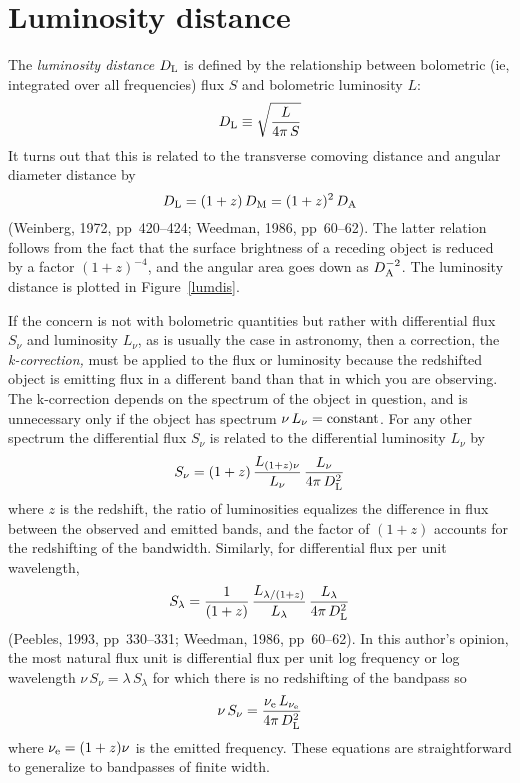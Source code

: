 \section{Luminosity distance}

The {\em luminosity distance\/} $D_{\rm L}$ is defined by the
relationship between bolometric (ie, integrated over all frequencies)
flux $S$ and bolometric luminosity $L$:
\begin{equation}
D_{\rm L}\equiv \sqrt{\frac{L}{4\pi\,S}}
\end{equation}
It turns out that this is related to the transverse comoving distance
and angular diameter distance by
\begin{equation}
D_{\rm L} = (1+z)\,D_{\rm M} = (1+z)^2\,D_{\rm A}
\end{equation}
(Weinberg, 1972, pp~420--424; Weedman, 1986, pp~60--62).  The latter
relation follows from the fact that the surface brightness of a
receding object is reduced by a factor $(1+z)^{-4}$, and the angular
area goes down as $D_{\rm A}^{-2}$.  The luminosity distance is
plotted in Figure~\ref{lumdis}.

If the concern is not with bolometric quantities but rather with
differential flux $S_{\nu}$ and luminosity $L_{\nu}$, as is usually
the case in astronomy, then a correction, the {\em k-correction,\/}
must be applied to the flux or luminosity because the redshifted
object is emitting flux in a different band than that in which you are
observing.  The k-correction depends on the spectrum of the object in
question, and is unnecessary only if the object has spectrum
$\nu\,L_{\nu}={\rm constant}$.  For any other spectrum the
differential flux $S_{\nu}$ is related to the differential luminosity
$L_{\nu}$ by
\begin{equation}
S_{\nu} = (1+z)\,\frac{L_{(1+z)\nu}}{L_{\nu}}\,\frac{L_{\nu}}{4\pi\,D_{\rm L}^2}
\end{equation}
where $z$ is the redshift, the ratio of luminosities equalizes the
difference in flux between the observed and emitted bands, and the
factor of $(1+z)$ accounts for the redshifting of the bandwidth.
Similarly, for differential flux per unit wavelength,
\begin{equation}
S_{\lambda} = \frac{1}{(1+z)}\,\frac{L_{\lambda/(1+z)}}{L_{\lambda}}\,
\frac{L_{\lambda}}{4\pi\,D_{\rm L}^2}
\end{equation}
(Peebles, 1993, pp~330--331; Weedman, 1986, pp~60--62).  In this
author's opinion, the most natural flux unit is differential flux per
unit log frequency or log wavelength
$\nu\,S_{\nu}=\lambda\,S_{\lambda}$ for which there is no redshifting
of the bandpass so
\begin{equation}
\nu\,S_{\nu} = \frac{\nu_{\rm e}\,L_{\nu_{\rm e}}}{4\pi\,D_{\rm L}^2}
\end{equation}
where $\nu_{\rm e}=(1+z)\nu$ is the emitted frequency.  These
equations are straightforward to generalize to bandpasses of finite
width.

